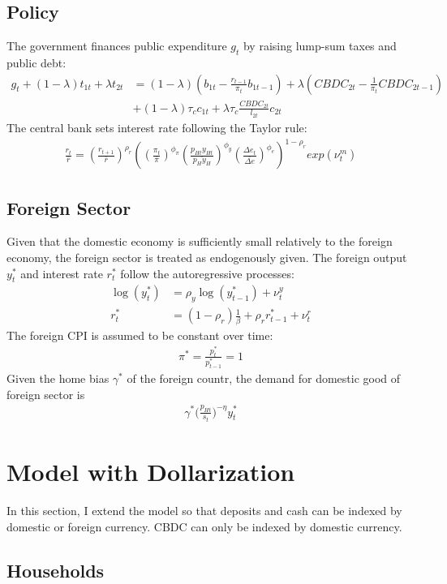 \documentclass[12pt]{article}
\begin{document}
\subsection{Policy}
The government finances public expenditure $g_t$ by raising lump-sum taxes and public debt:
\begin{align*}
g_t + (1-\lambda)t_{1t}+\lambda t_{2t} &= (1-\lambda)(b_{1t}-\frac{r_{t-1}}{\pi_t}b_{1t-1})+\lambda(CBDC_{2t}-\frac{1}{\pi_t} CBDC_{2t-1} ) \\
& + (1-\lambda)\tau_c c_{1t} +\lambda\tau_c\frac{CBDC_{2t}}{l_{2t}}c_{2t}
\end{align*}
The central bank sets interest rate following the Taylor rule: 
\begin{align*}
\frac{r_t}{\bar{r}} = (\frac{r_{t+1}}{\bar{r}})^{\rho_r}((\frac{\pi_t}{\bar{\pi}} )^{\phi_{\pi}} (\frac{p_{Ht}y_{Ht}}{\bar{p_Hy_H}})^{\phi_y} (\frac{\Delta e_t}{\bar{\Delta e}})^{\phi_e})^{1-\rho_r}exp(\nu_t^m)
\end{align*}

\subsection{Foreign Sector}
Given that the domestic economy is sufficiently small relatively to the foreign economy, the foreign sector is treated as endogenously given. The foreign output $y_t^*$ and interest rate $r_t^*$ follow the autoregressive processes: 
\begin{align*}
\log(y_t^*) &= \rho_y\log(y_{t-1}^*)+\nu_t^y \\
r_t^*&= (1-\rho_r)\frac{1}{\beta}+\rho_rr_{t-1}^*+\nu_t^r 
\end{align*}
The foreign CPI is assumed to be constant over time:
\begin{align*}
\pi^* = \frac{p_t^*}{p_{t-1}^*} = 1
\end{align*}
Given the home bias $\gamma^*$ of the foreign countr, the demand for domestic good of foreign sector is 
\begin{align*}
\gamma^*\Big(\frac{p_{Ht}}{s_t}\Big)^{-\eta}y_t^*
\end{align*}
\section{Model with Dollarization}
In this section, I extend the model so that deposits and cash can be indexed by domestic or foreign currency. CBDC can only be indexed by domestic currency. 
\subsection{Households}
\end{document}
